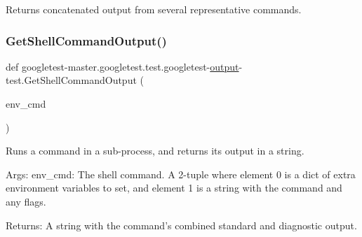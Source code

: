 \begin{DoxyVerb}Returns concatenated output from several representative commands.\end{DoxyVerb}
 \mbox{\label{namespacegoogletest-master_1_1googletest_1_1test_1_1googletest-output-test_aa982dca3285605db207fb98817d0c456}} 
\subsubsection{\texorpdfstring{GetShellCommandOutput()}{GetShellCommandOutput()}}
{\footnotesize\ttfamily def googletest-\/master.\+googletest.\+test.\+googletest-\/\mbox{\hyperlink{namespacegoogletest-master_1_1googletest_1_1test_1_1googletest-output-test_a734f0a5bd94ba038f4350763c6977129}{output}}-\/test.\+Get\+Shell\+Command\+Output (\begin{DoxyParamCaption}\item[{}]{env\+\_\+cmd }\end{DoxyParamCaption})}

\begin{DoxyVerb}Runs a command in a sub-process, and returns its output in a string.

Args:
  env_cmd: The shell command. A 2-tuple where element 0 is a dict of extra
           environment variables to set, and element 1 is a string with
           the command and any flags.

Returns:
  A string with the command's combined standard and diagnostic output.
\end{DoxyVerb}
 \mbox{\label{namespacegoogletest-master_1_1googletest_1_1test_1_1googletest-output-test_acf0af3b4864cbae6643a6d3ec71abcf3}} 
